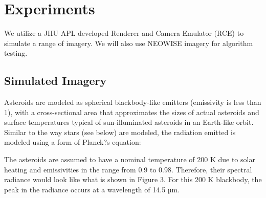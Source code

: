 \section{Experiments}
%
%
%
%
%

\label{sec:experiments}

We  utilize a JHU APL developed Renderer and Camera Emulator (RCE) to simulate a range of imagery.  We will also use NEOWISE imagery for algorithm testing.  

\subsection{Simulated Imagery}
\label{ssec:simulated}

Asteroids are  modeled as spherical blackbody-like emitters (emissivity is less than 1), with a cross-sectional area that approximates the sizes of actual asteroids and surface temperatures typical of sun-illuminated asteroids in an Earth-like orbit.  Similar to the way stars (see below) are modeled, the radiation emitted is modeled using a form of Planck?s equation:
 
 The asteroids are assumed to have a nominal temperature of 200 K due to solar heating and emissivities in the range from 0.9 to 0.98. Therefore, their spectral radiance would look like what is shown in Figure 3.  For this 200 K blackbody, the peak in the radiance occurs at a wavelength of 14.5 µm.
 
